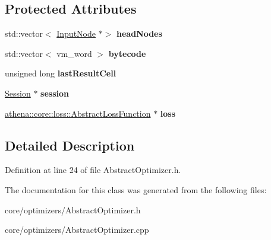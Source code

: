 \subsection*{Protected Attributes}
\begin{DoxyCompactItemize}
\item 
\mbox{\label{classathena_1_1core_1_1optimizers_1_1_abstract_optimizer_a531c36dd399081caeacfc8974805de79}} 
std\+::vector$<$ \mbox{\hyperlink{classathena_1_1core_1_1_input_node}{Input\+Node}} $\ast$$>$ {\bfseries head\+Nodes}
\item 
\mbox{\label{classathena_1_1core_1_1optimizers_1_1_abstract_optimizer_ad96008b4e5dec5e9bf5ece0cf4fdcba6}} 
std\+::vector$<$ vm\+\_\+word $>$ {\bfseries bytecode}
\item 
\mbox{\label{classathena_1_1core_1_1optimizers_1_1_abstract_optimizer_abd29bf7d7d1f9f553756b918f526e2fc}} 
unsigned long {\bfseries last\+Result\+Cell}
\item 
\mbox{\label{classathena_1_1core_1_1optimizers_1_1_abstract_optimizer_a7cc6da9a5944cf7eba19dc04814e478b}} 
\mbox{\hyperlink{classathena_1_1core_1_1_session}{Session}} $\ast$ {\bfseries session}
\item 
\mbox{\label{classathena_1_1core_1_1optimizers_1_1_abstract_optimizer_a9043b6609054109d6f590477bd62c975}} 
\mbox{\hyperlink{classathena_1_1core_1_1loss_1_1_abstract_loss_function}{athena\+::core\+::loss\+::\+Abstract\+Loss\+Function}} $\ast$ {\bfseries loss}
\end{DoxyCompactItemize}


\subsection{Detailed Description}


Definition at line 24 of file Abstract\+Optimizer.\+h.



The documentation for this class was generated from the following files\+:\begin{DoxyCompactItemize}
\item 
core/optimizers/Abstract\+Optimizer.\+h\item 
core/optimizers/Abstract\+Optimizer.\+cpp\end{DoxyCompactItemize}
